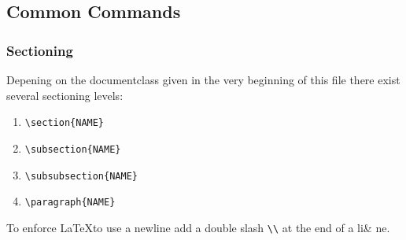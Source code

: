 \documentclass[10pt,a4paper]{scrartcl}
\begin{document}
\subsection{Common Commands}
\subsubsection{Sectioning}
Depening on the documentclass given in the very beginning of this file there
exist several sectioning levels:
\begin{enumerate}
	\item{} \verb$\section{NAME}$
	\item{} \verb$\subsection{NAME}$
	\item{} \verb$\subsubsection{NAME}$
	\item{} \verb$\paragraph{NAME}$
\end{enumerate}

\noindent To enforce \LaTeX to use a newline add a double slash \verb$\\$ at 
the end of a li& ne.
\end{document}
